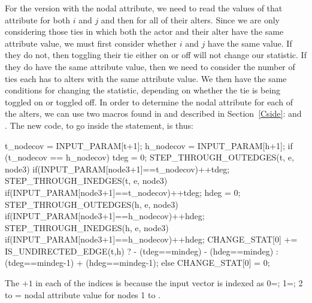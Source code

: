 \documentclass[nojss]{jss}
\begin{document}
For the version with the nodal attribute, we need to read the values of that attribute for both $i$ and $j$ and then for all of their alters.  Since we are only considering those ties in which both the actor and their alter have the same attribute value, we must first consider whether $i$ and $j$ have the same value.  If they do not, then toggling their tie either on or off will not change our statistic. If they do have the same attribute value, then we need to consider the number of ties each has to alters with the same attribute value. We then have the same conditions for changing the statistic, depending on whether the tie is being toggled on or toggled off. In order to determine the nodal attribute for each of the alters, we can use two macros found in  and described in Section~\ref{Cside}:  and . The new code, to go inside the  statement, is thus:
\begin{CodeChunk}
\begin{CodeInput}
      t_nodecov = INPUT_PARAM[t+1];
      h_nodecov = INPUT_PARAM[h+1];
      if (t_nodecov == h_nodecov) {
        tdeg = 0;
        STEP_THROUGH_OUTEDGES(t, e, node3) {
          if(INPUT_PARAM[node3+1]==t_nodecov){++tdeg;}
        }
        STEP_THROUGH_INEDGES(t, e, node3) {
          if(INPUT_PARAM[node3+1]==t_nodecov){++tdeg;}
        }
        hdeg = 0;
        STEP_THROUGH_OUTEDGES(h, e, node3) {
          if(INPUT_PARAM[node3+1]==h_nodecov){++hdeg;}
        }
        STEP_THROUGH_INEDGES(h, e, node3) {
          if(INPUT_PARAM[node3+1]==h_nodecov){++hdeg;}
        }
        CHANGE_STAT[0] += IS_UNDIRECTED_EDGE(t,h) ?
          - (tdeg==mindeg) - (hdeg==mindeg) :
          (tdeg==mindeg-1) + (hdeg==mindeg-1);
      }else{
        CHANGE_STAT[0] = 0;
      }

\end{CodeInput}
\end{CodeChunk}
The $+1$ in each of the  indices is because the input vector
is indexed as 0=; 1=; 2 to  = nodal
attribute value for nodes 1 to .
\end{document}
